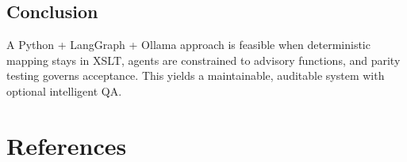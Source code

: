 \documentclass[11pt]{article}
\begin{document}
\subsection{Conclusion}
A Python + LangGraph + Ollama approach is feasible when deterministic mapping stays in XSLT, agents are constrained to advisory functions, and parity testing governs acceptance. This yields a maintainable, auditable system with optional intelligent QA.

\section{References}


\end{document}

